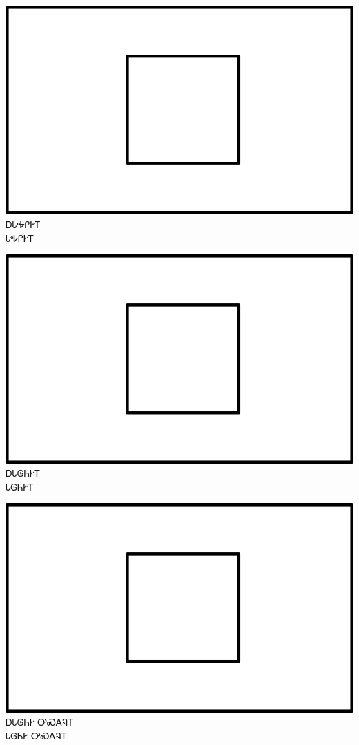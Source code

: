 \documentclass[avery5371]{flashcards}%
\begin{document}
\begin{flashcard}{
\includegraphics[width=0.95\columnwidth,height=.51\columnwidth,keepaspectratio]{../artwork/for-colors/square-white}
}\Huge ᎠᏓᎭᎵᎨᎢ\\ᏓᎭᎵᎨᎢ
\end{flashcard}

\begin{flashcard}{
\includegraphics[width=0.95\columnwidth,height=.51\columnwidth,keepaspectratio]{../artwork/for-colors/square-white}
}\Huge ᎠᏓᎶᏂᎨᎢ\\ᏓᎶᏂᎨᎢ
\end{flashcard}

\begin{flashcard}{
\includegraphics[width=0.95\columnwidth,height=.51\columnwidth,keepaspectratio]{../artwork/for-colors/square-white}
}\Huge ᎠᏓᎶᏂᎨ ᎤᏍᎪᎸᎢ\\ᏓᎶᏂᎨ ᎤᏍᎪᎸᎢ
\end{flashcard}
\end{document}

